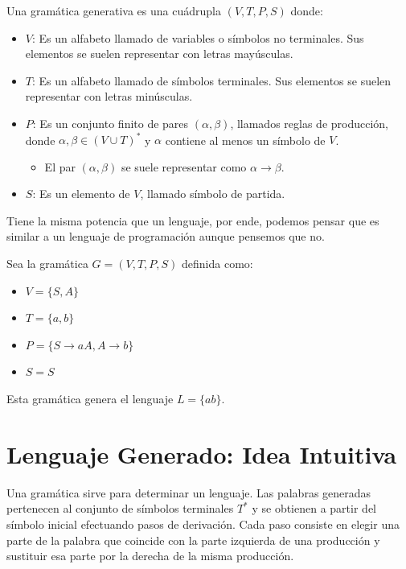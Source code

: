 \documentclass[12pt]{book} %
\begin{document}
\begin{definicion}
Una gramática generativa es una cuádrupla $(V, T, P, S)$ donde:

\begin{itemize}
    \item \textbf{$V$}: Es un alfabeto llamado de variables o símbolos no terminales. Sus elementos se suelen representar con letras mayúsculas.
    \item \textbf{$T$}: Es un alfabeto llamado de símbolos terminales. Sus elementos se suelen representar con letras minúsculas.
    \item \textbf{$P$}: Es un conjunto finito de pares $(\alpha, \beta)$, llamados reglas de producción, donde $\alpha, \beta \in (V \cup T)^*$ y $\alpha$ contiene al menos un símbolo de $V$.
        \begin{itemize}
            \item El par $(\alpha, \beta)$ se suele representar como $\alpha \to \beta$.
        \end{itemize}
    \item \textbf{$S$}: Es un elemento de $V$, llamado símbolo de partida.
\end{itemize}
\end{definicion}

Tiene la misma potencia que un lenguaje, por ende, podemos pensar que es
similar a un lenguaje de programación aunque pensemos que no.

\begin{ejemplo}
Sea la gramática $G = (V, T, P, S)$ definida como:  
    \begin{itemize}
        \item $V = \{S, A\}$  
        \item $T = \{a, b\}$  
        \item $P = \{S \to aA, A \to b\}$  
        \item $S = S$  
    \end{itemize}
\end{ejemplo}

Esta gramática genera el lenguaje \(L = \{ab\}\).

\hypertarget{lenguaje-generado-idea-intuitiva}{%
\section{Lenguaje Generado: Idea
Intuitiva}\label{lenguaje-generado-idea-intuitiva}}

Una gramática sirve para determinar un lenguaje. Las palabras generadas
pertenecen al conjunto de símbolos terminales \(T^*\) y se obtienen a
partir del símbolo inicial efectuando pasos de derivación. Cada paso
consiste en elegir una parte de la palabra que coincide con la parte
izquierda de una producción y sustituir esa parte por la derecha de la
misma producción.
\end{document}
